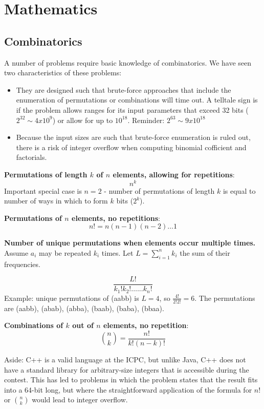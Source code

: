 \chapter{Mathematics}

\section{Combinatorics}

A number of problems require basic knowledge of combinatorics.  
We have seen two characteristics of these problems:
\begin{itemize}
\item They are designed such that brute-force approaches that include the enumeration of
    permutations or combinations will time out.  A telltale sign is if the problem allows
    ranges for its input parameters that exceed 32 bits ($2^{32} \sim 4 x 10^9$) or allow
    for up to $10^{18}$.  Reminder: $2^{63} \sim 9 x 10^{18}$
\item Because the input sizes are such that brute-force enumeration is ruled out, there
    is a risk of integer overflow when computing binomial cofficient and factorials.
\end{itemize}

\textbf{Permutations of length $k$ of $n$ elements, allowing for repetitions}: 
\[
    n^k
\]
Important special case is $n=2$ - number of permutations
of length $k$ is equal to number of ways in which to form $k$ bits ($2^k$).

\textbf{Permutations of $n$ elements, no repetitions}: 
\[
    n! = n (n-1) (n-2) \ldots 1
\]


\textbf{Number of unique permutations when elements occur multiple times.}  Assume $a_i$ may be repeated $k_i$ times. 
    Let $L = \sum_{i = 1}^{n} k_i$ the sum of their frequencies.

\[
    \frac{L!}{k_1! k_2! \ldots ... k_n!}
\]
Example: unique permutations of (aabb) is $L = 4$, so $\frac{4!}{2! 2!} = 6$.  The permutations are
(aabb), (abab), (abba), (baab), (baba), (bbaa).

\textbf{Combinations of $k$ out of $n$ elements, no repetition}:
\[
    \binom{n}{k} = \frac{n!}{k! (n-k)!}
\]

Aside: C++ is a valid language at the ICPC, but unlike Java, C++ does not have a standard
library for arbitrary-size integers that is accessible during the contest.  This has led to problems in which
the problem states that the result fits into a 64-bit long, but where the straightforward
application of the formula for $n!$ or $\binom{n}{k}$ would lead to integer overflow.

